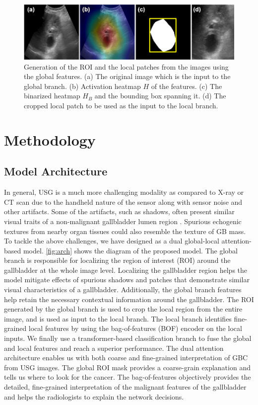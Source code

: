 
\begin{figure}[t]
    \centering
    \includegraphics[width=0.85\linewidth,height=8em
    ]{figs/radformer/gen-roi.png}
    \caption[Generation of the ROI and the local patches]{Generation of the ROI and the local patches from the images using the global features. (a) The original image which is the input to the global branch. (b) Activation heatmap $H$ of the features. (c) The binarized heatmap $H_B$ and the bounding box spanning it. (d) The cropped local patch to be used as the input to the local branch.}
    \label{fig:roi_mask}
\end{figure}

\section{Methodology}

\subsection{Model Architecture}

In general, USG is a much more challenging modality as compared to X-ray or CT scan due to the handheld nature of the sensor along with sensor noise and other artifacts. Some of the artifacts, such as shadows, often present similar visual traits of a non-malignant gallbladder lumen region \cite{basu2022surpassing}. Spurious echogenic textures from nearby organ tissues could also resemble the texture of GB mass. To tackle the above challenges, we have designed \radformer as a dual global-local attention-based model. \cref{fig:arch} shows the diagram of the proposed \radformer model. The global branch is responsible for localizing the region of interest (ROI) around the gallbladder at the whole image level. Localizing the gallbladder region helps the model mitigate effects of spurious shadows and patches that demonstrate similar visual characteristics of a gallbladder. Additionally, the global branch features help retain the necessary contextual information around the gallbladder. The ROI generated by the global branch is used to crop the local region from the entire image, and is used as input to the local branch. The local branch identifies fine-grained local features by using the bag-of-features (BOF) encoder on the local inputs. We finally use a transformer-based classification branch to fuse the global and local features and reach a superior performance. The dual attention architecture enables us with both coarse and fine-grained interpretation of GBC from USG images. The global ROI mask provides a coarse-grain explanation and tells us where to look for the cancer. The bag-of-features objectively provides the detailed, fine-grained interpretation of the malignant features of the gallbladder and helps the radiologists to explain the network decisions.

